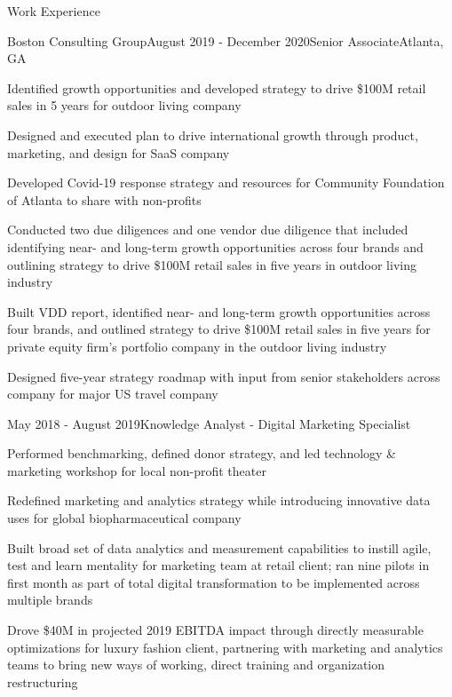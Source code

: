 \documentclass{resume} %
\begin{document}
\begin{rSection}{Work Experience}
\begin{rSubsection}{Boston Consulting Group}{August 2019 - December 2020}{Senior Associate}{Atlanta, GA}
\item Identified growth opportunities and developed strategy to drive \$100M retail sales in 5 years for outdoor living company
\item Designed and executed plan to drive international growth through product, marketing, and design for SaaS company
\item Developed Covid-19 response strategy and resources for Community Foundation of Atlanta to share with non-profits
\item Conducted two due diligences and one vendor due diligence that included identifying near- and long-term growth opportunities across four brands and outlining strategy to drive \$100M retail sales in five years in outdoor living industry
\item Built VDD report, identified near- and long-term growth opportunities across four brands, and outlined strategy to drive \$100M retail sales in five years for private equity firm’s portfolio company in the outdoor living industry
\item Designed five-year strategy roadmap with input from senior stakeholders across company for major US travel company
\end{rSubsection}


\begin{rSubsection}{}{May 2018 - August 2019}{Knowledge Analyst - Digital Marketing Specialist}{}
\item Performed benchmarking, defined donor strategy, and led technology \& marketing workshop for local non-profit theater
\item Redefined marketing and analytics strategy while introducing innovative data uses for global biopharmaceutical company
\item Built broad set of data analytics and measurement capabilities to instill agile, test and learn mentality for marketing team at retail client; ran nine pilots in first month as part of total digital transformation to be implemented across multiple brands
\item Drove \$40M in projected 2019 EBITDA impact through directly measurable optimizations for luxury fashion client, partnering with marketing and analytics teams to bring new ways of working, direct training and organization restructuring
\end{rSubsection}


\end{rSection}
\end{document}
